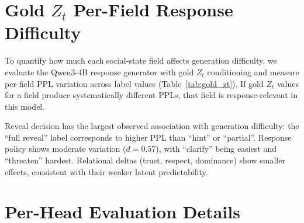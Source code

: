 \documentclass[11pt]{article}
\begin{document}
\section{Gold $Z_t$ Per-Field Response Difficulty}
\label{app:gold_zt_bridge}

To quantify how much each social-state field affects generation difficulty, we evaluate the Qwen3-4B response generator with gold $Z_t$ conditioning and measure per-field PPL variation across label values (Table~\ref{tab:gold_zt}).
If gold $Z_t$ values for a field produce systematically different PPLs, that field is response-relevant in this model.

\begin{table}[tp]
\centering
\caption{Gold $Z_t$ per-field response PPL variation ($n=500$ examples). Effect size is Cohen's $d$ across label values.}
\label{tab:gold_zt}
\footnotesize
{}
\end{table}

Reveal decision has the largest observed association with generation difficulty: the ``full reveal'' label corresponds to higher PPL than ``hint'' or ``partial''.
Response policy shows moderate variation ($d{=}0.57$), with ``clarify'' being easiest and ``threaten'' hardest.
Relational deltas (trust, respect, dominance) show smaller effects, consistent with their weaker latent predictability.

\section{Per-Head Evaluation Details}
\label{app:perhead}
\end{document}

